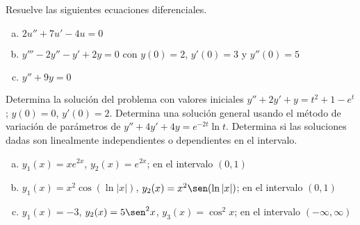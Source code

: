 \documentclass[12pt]{exam}
\begin{document}
\begin{questions}
     \question%
     Resuelve las siguientes ecuaciones diferenciales.
     \begin{enumerate}[a)]
         \item $2u''+7u'-4u=0$
         \item $y'''-2y''-y'+2y=0$ con $y(0)=2$, $y'(0)=3$ y $y''(0)=5$
         \item $y''+9y=0$
     \end{enumerate}

     \question%
     Determina la solución del problema con valores iniciales $y''+2y'+y=t^2+1-e^t$;  $y(0)=0$,  $y'(0)=2$.
     \question%
     Determina una solución general usando el método de variación de parámetros de $y''+4y'+4y=e^{-2t}\ln t$.
     \question%
     Determina si las soluciones dadas son linealmente independientes o dependientes en el intervalo.
     \begin{enumerate}[a)]
         \item $y_1(x)=xe^{2x}$, $y_2(x)=e^{2x}$; en el intervalo $(0,1)$
         \item $y_1(x)=x^2\cos(\ln|x|)$, $y_2(x)=x^2\sen(\ln|x|)$; en el intervalo $(0,1)$
         \item $y_1(x)=-3$, $y_2(x)=5\sen^2x$, $y_3(x)=\cos^2x$; en el intervalo $(-\infty,\infty)$
     \end{enumerate}



    \end{questions}
\end{document}
